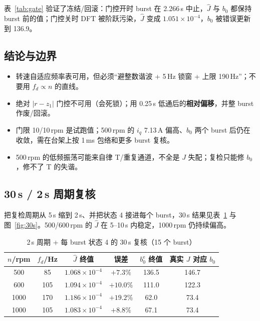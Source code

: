 \documentclass[11pt,a4paper]{article}
\newcommand{\Jhat}{\hat J}
\begin{document}
表~\ref{tab:gate} 验证了冻结/回滚：门控开时 burst 在 2.266\,s 中止，$\Jhat$ 与 $b_0$ 都保持 burst 前的值；门控关时 DFT 被阶跃污染，$\Jhat$ 变成 $1.051\times10^{-4}$，$b_0$ 被错误更新到 136.9。

\subsection{结论与边界}

\begin{itemize}
  \item 转速自适应频率表可用，但必须“避整数谐波 + 5\,Hz 锁窗 + 上限 190\,Hz”；不要用 $f_d\propto n$ 的直线。
  \item 绝对 $|r-z_1|$ 门控不可用（会死锁）；用 0.25\,s 低通后的\textbf{相对偏移}，并整 burst 作废/回滚。
  \item 门限 10/10\,rpm 是试跑值；500\,rpm 的 $i_q$ 7.13\,A 偏高、$b_0$ 两个 burst 后仍在收敛，需在台架上按 1\,ms 包络和更多 burst 复核。
  \item 500\,rpm 的低频振荡可能来自律 T/重复通道，不全是 $J$ 失配；复检只能修 $b_0$，修不了 T 的失谐。
\end{itemize}


\subsection{30\,s / 2\,s 周期复核}

把复检周期从 5\,s 缩到 2\,s、并把状态 4 接进每个 burst，30\,s 结果见表~\ref{tab:30s} 与图~\ref{fig:30s}。500/600\,rpm 的 $\Jhat$ 在 5--10\,s 内稳定，1000\,rpm 仍持续偏高。

\begin{table}[H]
\centering\footnotesize
\caption{2\,s 周期 + 每 burst 状态 4 的 30\,s 复核（15 个 burst）}\label{tab:30s}
\begin{tabular}{@{}cccccc@{}}
\toprule
$n$/rpm & $f_d$/Hz & $\Jhat$ 终值 & 误差 & $b_0^{\mathrm e}$ 终值 & 真实 $J$ 对应 $b_0$\\
\midrule
500 & 85 & $1.068\times10^{-4}$ & $+7.3\%$ & 136.5 & 146.7\\
600 & 105 & $1.094\times10^{-4}$ & $+10.0\%$ & 111.0 & 122.3\\
1000 & 170 & $1.186\times10^{-4}$ & $+19.2\%$ & 62.0 & 73.4\\
1000 & 105 & $1.083\times10^{-4}$ & $+8.8\%$ & 67.1 & 73.4\\
\bottomrule
\end{tabular}
\end{table}
\end{document}
